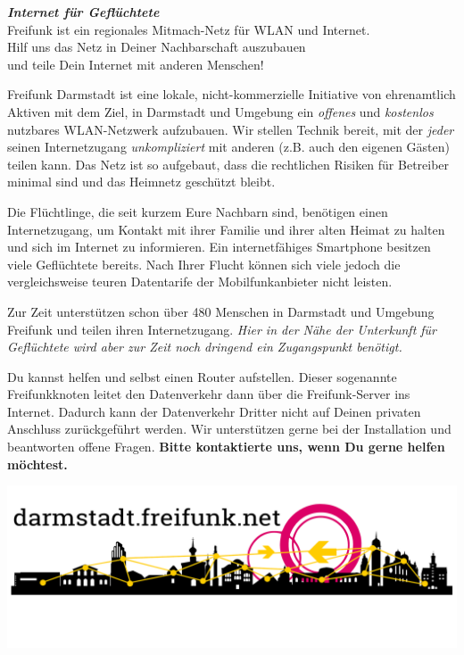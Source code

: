 \documentclass[a4paper]{article}
\begin{document}
\thispagestyle{empty}

\begin{center}
\Huge \textit{\textbf{\textcolor{freifunkpink}{Internet für Geflüchtete}}} \\
\vspace{0.6cm}
\large Freifunk ist ein regionales Mitmach-Netz für WLAN und Internet.\\
Hilf uns das Netz in Deiner Nachbarschaft auszubauen \\
und teile Dein Internet mit anderen Menschen!
\normalsize

\vspace{1.0cm}
\end{center}

{ }
\vspace{0.5cm}

Freifunk Darmstadt ist eine lokale, nicht-kommerzielle Initiative von ehrenamtlich Aktiven mit dem Ziel, in Darmstadt und Umgebung ein \emph{offenes} und \emph{kostenlos} nutzbares WLAN-Netzwerk aufzubauen. Wir stellen Technik bereit, mit der \emph{jeder} seinen Internetzugang \emph{unkompliziert} mit anderen (z.B. auch den eigenen Gästen) teilen kann. Das Netz ist so aufgebaut, dass die rechtlichen Risiken für Betreiber minimal sind und das Heimnetz geschützt bleibt.

Die Flüchtlinge, die seit kurzem Eure Nachbarn sind, benötigen einen Internetzugang, um Kontakt mit ihrer Familie und ihrer alten Heimat zu halten und sich im Internet zu informieren. Ein internetfähiges Smartphone besitzen viele Geflüchtete bereits. Nach Ihrer Flucht können sich viele jedoch die vergleichsweise teuren Datentarife der Mobilfunkanbieter nicht leisten.

Zur Zeit unterstützen schon über 480 Menschen in Darmstadt und Umgebung Freifunk und teilen ihren Internetzugang. \emph{Hier in der Nähe der Unterkunft für Geflüchtete wird aber zur Zeit noch dringend ein Zugangspunkt benötigt.}

Du kannst helfen und selbst einen Router aufstellen. Dieser sogenannte Freifunkknoten leitet den Datenverkehr dann über die Freifunk-Server ins Internet. Dadurch kann der Datenverkehr Dritter nicht auf Deinen privaten Anschluss zurückgeführt werden. Wir unterstützen gerne bei der Installation und beantworten offene Fragen. \textbf{Bitte kontaktierte uns, wenn Du gerne helfen möchtest.}

\vspace{0.67cm}
\hspace{-0.24cm}
\includegraphics[width=0.965\paperwidth]{../images/footer_dark}
\end{document}

